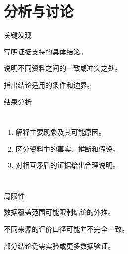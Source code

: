 \section{分析与讨论}

\begin{frame}{关键发现}
  \begin{keypoints}
    \item {}写明证据支持的具体结论。
    \item {}说明不同资料之间的一致或冲突之处。
    \item {}指出结论适用的条件和边界。
  \end{keypoints}
\end{frame}

\begin{frame}{结果分析}
  \begin{columns}[T,onlytextwidth]
      \begin{enumerate}
        \item 解释主要现象及其可能原因。
        \item 区分资料中的事实、推断和假设。
        \item 对相互矛盾的证据给出合理说明。
      \end{enumerate}
      \centering
  \end{columns}
\end{frame}

\begin{frame}{局限性}
  \begin{keypoints}
    \item 数据覆盖范围可能限制结论的外推。
    \item 不同来源的评价口径可能并不完全一致。
    \item 部分结论仍需实验或更多数据验证。
  \end{keypoints}
\end{frame}
